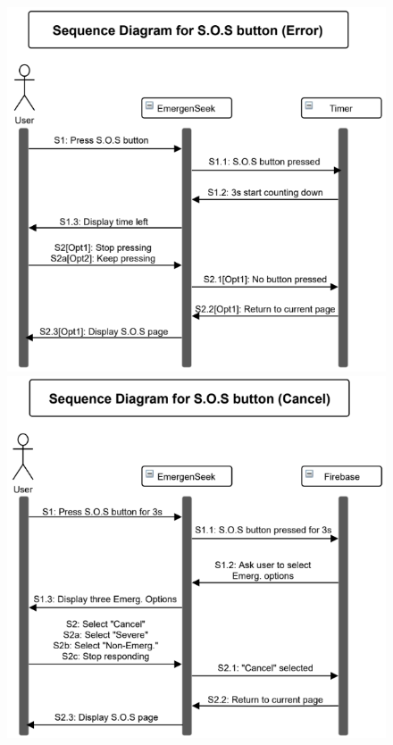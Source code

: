 \documentclass[10pt, a4paper]{article}
\begin{document}
\begin{figure}[H]
  \centerline{
  	\includegraphics[scale=0.6]{diagrams/sequence-5a.png}
  	\includegraphics[scale=0.6]{diagrams/sequence-5b.png}
  } 
  \centerline{
}
\end{figure}
\end{document}

